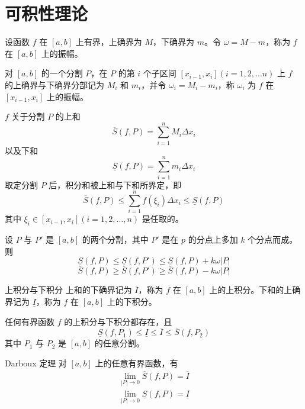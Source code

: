 
\section{可积性理论}

\begin{definition}
    设函数 $f$ 在 $[a, b]$ 上有界，上确界为 $M$，下确界为 $m$。令 $\omega = M - m$，称为 $f$ 在 $[a, b]$ 上的振幅。

    对 $[a, b]$ 的一个分割 $P$，在 $P$ 的第 $i$ 个子区间 $[x_{i - 1},x_i](i = 1,2, \ldots n)$ 上 $f$ 的上确界与下确界分部记为 $M_i$ 和 $m_i$，并令 $\omega_i = M_i - m_i$，称 $\omega_i$ 为 $f$ 在 $[x_{i - 1},x_i]$ 上的振幅。
\end{definition}

\begin{definition}
    $f$ 关于分割 $P$ 的上和
    \[\overline{S}(f,P) = \sum_{i = 1}^{n}M_{i}\Delta x_i\]
    以及下和
    \[\underline{S}(f,P) = \sum_{i = 1}^{n}m_{i}\Delta x_i\]
    取定分割 $P$ 后，积分和被上和与下和所界定，即
    \[\overline{S}(f,P) \leqslant  \sum_{i = 1}^{n}f(\xi_{i})\Delta x_i \leqslant \underline{S}(f,P)\]
    其中 $\xi_i \in [x_{i - 1},x_i](i = 1,2, \ldots ,n)$ 是任取的。
\end{definition}

\begin{theorem}
    设 $P$ 与 $P'$ 是 $[a, b]$ 的两个分割，其中 $P'$ 是在 $p$ 的分点上多加 $k$ 个分点而成。则
    \[\underline{S}(f,P) \leqslant \underline{S}(f,P') \leqslant \underline{S}(f,P) + k\omega|P|\]
    \[\overline{S}(f,P) \geqslant \overline{S}(f,P') \geqslant \overline{S}(f,P) - k\omega|P|\]
\end{theorem}

\begin{definition}{上积分与下积分}
    上和的下确界记为 $\overline{I}$，称为 $f$ 在 $[a, b]$ 上的上积分。下和的上确界记为 $\underline{I}$，称为 $f$ 在 $[a, b]$ 上的下积分。

    任何有界函数 $f$ 的上积分与下积分都存在，且
    \[\underline{S}(f,P_1) \leqslant \underline{I} \leqslant \overline{I} \leqslant \overline{S}(f,P_2)\]
    其中 $P_1$ 与 $P_2$ 是 $[a, b]$ 的任意分割。
\end{definition}

\begin{theorem}{Darboux 定理}
    对 $[a, b]$ 上的任意有界函数，有
    \begin{align*}
        \lim_{|P| \to 0}\overline{S}(f,P) = \overline{I} \\
        \lim_{|P| \to 0}\underline{S}(f,P) = \underline{I}
    \end{align*}
\end{theorem}

